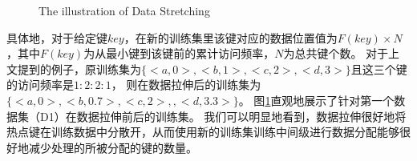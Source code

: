 
\begin{figure}[!htp]
  \centering
    {The illustration of Data Stretching}
  \label{fig:stretch-illus}
\end{figure}

具体地，对于给定键$key$，在新的训练集里该键对应的数据位置值为$F(key) \times N$，其中$F(key)$为从最小键到该键前的累计访问频率，$N$为总共键个数。
对于上文提到的例子，原训练集为$\{<a, 0>, <b, 1>, <c, 2>, <d, 3>\}$且这三个键的访问频率是$1:2:2:1$，
则在数据拉伸后的训练集为$\{<a, 0>, <b, 0.7>, <c, 2>, , <d, 3.3>\}$。
图\ref{fig:stretch-illus}直观地展示了针对第一个数据集（D1）在数据拉伸前后的训练集。
我们可以明显地看到，数据拉伸很好地将热点键在训练数据中分散开，从而使用新的训练集训练中间级{\model}进行数据分配能够很好地减少处理{\hotkey}的{\model}所被分配的键的数量。


